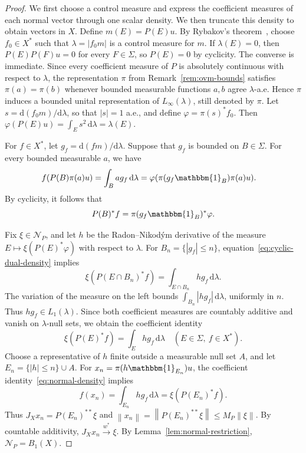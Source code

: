 \documentclass[11pt,leqno]{amsart}
\theoremstyle{compact}
\numberwithin{equation}{section}
\theoremstyle{compactremark}
\theoremstyle{compact}
\newcommand{\1}{\mathbbm{1}}
\newcommand{\rmd}{\mathrm{d}}
\newcommand{\norm}[1]{\left\|#1\right\|}
\newcommand{\abs}[1]{\left|#1\right|}
\begin{document}
\begin{proof}
We first choose a control measure and express the coefficient measures of each normal vector through one scalar density. We then truncate this density to obtain vectors in $X$. Define $m(E)=P(E)u$. By Rybakov's theorem~\cite{Rybakov1970}, choose $f_0\in X^*$ such that $\lambda=\abs{f_0m}$ is a control measure for $m$. If $\lambda(E)=0$, then $P(E)P(F)u=0$ for every $F\in\Sigma$, so $P(E)=0$ by cyclicity. The converse is immediate. Since every coefficient measure of $P$ is absolutely continuous with respect to $\lambda$, the representation $\pi$ from Remark~\ref{rem:ovm-bounds} satisfies $\pi(a)=\pi(b)$ whenever bounded measurable functions $a,b$ agree $\lambda$-a.e. Hence $\pi$ induces a bounded unital representation of $L_\infty(\lambda)$, still denoted by $\pi$. Let $s=\rmd(f_0m)/\rmd\lambda$, so that $\abs{s}=1$ a.e., and define $\varphi=\pi(s)^*f_0$. Then $\varphi(P(E)u)=\int_E s^2\,\rmd\lambda=\lambda(E)$.

For $f\in X^*$, let $g_f=\rmd(fm)/\rmd\lambda$. Suppose that $g_f$ is bounded on $B\in\Sigma$. For every bounded measurable $a$, we have
\begin{align*}
f(P(B)\pi(a)u)
&=\int_B ag_f\,\rmd\lambda
=\varphi(\pi(g_f\1_B)\pi(a)u).
\end{align*}
By cyclicity, it follows that
\begin{equation}\label{eq:cyclic-dual-density}
P(B)^*f=\pi(g_f\1_B)^*\varphi.
\end{equation}

Fix $\xi\in \mathcal N_P$, and let $h$ be the Radon--Nikod\'ym derivative of the measure $E\mapsto\xi(P(E)^*\varphi)$ with respect to $\lambda$. For $B_n=\{\abs{g_f}\leq n\}$, equation~\eqref{eq:cyclic-dual-density} implies
\[
\xi(P(E\cap B_n)^*f)=\int_{E\cap B_n}hg_f\,\rmd\lambda.
\]
The variation of the measure on the left bounds $\int_{B_n}\abs{hg_f}\,\rmd\lambda$, uniformly in $n$. Thus $hg_f\in L_1(\lambda)$. Since both coefficient measures are countably additive and vanish on $\lambda$-null sets, we obtain the coefficient identity
\begin{equation}\label{eq:normal-density}
\xi(P(E)^*f)=\int_E hg_f\,\rmd\lambda\quad(E\in\Sigma,\ f\in X^*).
\end{equation}
Choose a representative of $h$ finite outside a measurable null set $A$, and let $E_n=\{\abs{h}\leq n\}\cup A$. For $x_n=\pi(h\1_{E_n})u$, the coefficient identity~\eqref{eq:normal-density} implies
\[
f(x_n)=\int_{E_n}hg_f\,\rmd\lambda=\xi(P(E_n)^*f).
\]
Thus $J_Xx_n=P(E_n)^{**}\xi$ and $\norm{x_n}=\norm{P(E_n)^{**}\xi}\leq M_P\norm{\xi}$. By countable additivity, $J_Xx_n\xrightarrow{w^*}\xi$. By Lemma~\ref{lem:normal-restriction}, $\mathcal N_P=B_1(X)$.
\end{proof}
\end{document}
